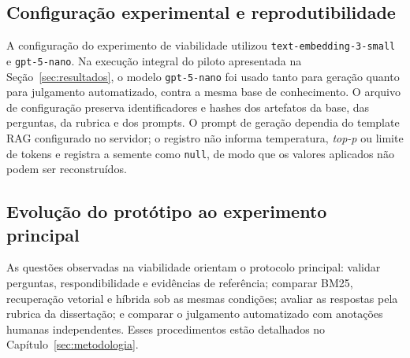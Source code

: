 \subsection{Configuração experimental e reprodutibilidade}\label{sec:config-viabilidade}

A configuração do experimento de viabilidade utilizou \texttt{text-embedding-3-small} e \texttt{gpt-5-nano}. Na execução integral do piloto apresentada na Seção~\ref{sec:resultados}, o modelo \texttt{gpt-5-nano} foi usado tanto para geração quanto para julgamento automatizado, contra a mesma base de conhecimento. O arquivo de configuração preserva identificadores e hashes dos artefatos da base, das perguntas, da rubrica e dos prompts. O prompt de geração dependia do template RAG configurado no servidor; o registro não informa temperatura, \textit{top-p} ou limite de tokens e registra a semente como \texttt{null}, de modo que os valores aplicados não podem ser reconstruídos.


\subsection{Evolução do protótipo ao experimento principal}

As questões observadas na viabilidade orientam o protocolo principal: validar perguntas, respondibilidade e evidências de referência; comparar BM25, recuperação vetorial e híbrida sob as mesmas condições; avaliar as respostas pela rubrica da dissertação; e comparar o julgamento automatizado com anotações humanas independentes. Esses procedimentos estão detalhados no Capítulo~\ref{sec:metodologia}.

